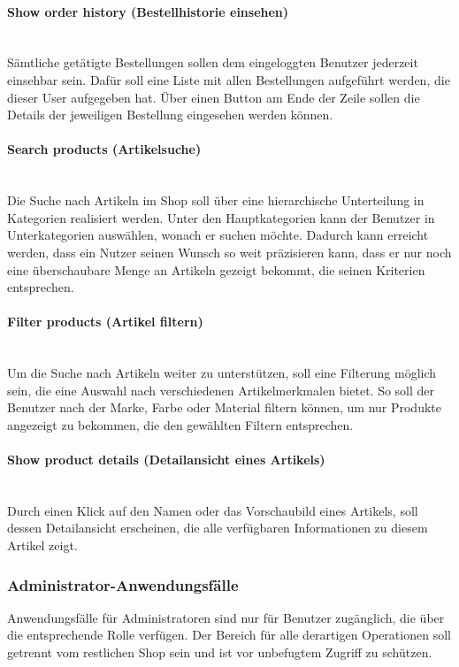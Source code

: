 \paragraph{Show order history (Bestellhistorie einsehen)}$\;$ \\
Sämtliche getätigte Bestellungen sollen dem eingeloggten Benutzer jederzeit einsehbar sein.
Dafür soll eine Liste mit allen Bestellungen aufgeführt werden, die dieser User aufgegeben hat.
Über einen Button am Ende der Zeile sollen die Details der jeweiligen Bestellung eingesehen werden können.
\paragraph{Search products (Artikelsuche)}$\;$ \\
Die Suche nach Artikeln im Shop soll über eine hierarchische Unterteilung in Kategorien realisiert werden.
Unter den Hauptkategorien kann der Benutzer in Unterkategorien auswählen, wonach er suchen möchte.
Dadurch kann erreicht werden, dass ein Nutzer seinen Wunsch so weit präzisieren kann, dass er nur noch eine überschaubare Menge an Artikeln gezeigt bekommt, die seinen Kriterien entsprechen.
\paragraph{Filter products (Artikel filtern)}$\;$ \\
Um die Suche nach Artikeln weiter zu unterstützen, soll eine Filterung möglich sein, die eine Auswahl nach verschiedenen Artikelmerkmalen bietet.
So soll der Benutzer nach der Marke, Farbe oder Material filtern können, um nur Produkte angezeigt zu bekommen, die den gewählten Filtern entsprechen.
\paragraph{Show product details (Detailansicht eines Artikels)}$\;$ \\
Durch einen Klick auf den Namen oder das Vorschaubild eines Artikels, soll dessen Detailansicht erscheinen, die alle verfügbaren Informationen zu diesem Artikel zeigt.
\subsubsection{Administrator-Anwendungsfälle}
Anwendungsfälle für Administratoren sind nur für Benutzer zugänglich, die über die entsprechende Rolle verfügen.
Der Bereich für alle derartigen Operationen soll getrennt vom restlichen Shop sein und ist vor unbefugtem Zugriff zu schützen.

